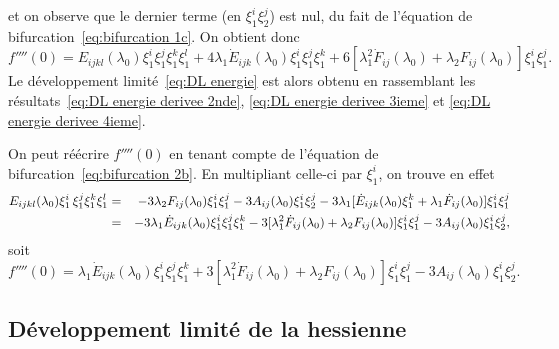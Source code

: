 \documentclass{article}
\newcommand{\mathlambda}{\lambda}
\newcommand{\nocomma}{}
\begin{document}
et on observe que le dernier terme (en $\xi_1^i \xi_2^j$) est nul, du fait de
l'{\'e}quation de bifurcation~\eqref{eq:bifurcation 1c}. On obtient donc
\begin{equation}
  \label{eq:DL energie derivee 4ieme} f'''' (0) = E_{i \nocomma j \nocomma k
  \nocomma l} (\lambda_0) \xi_1^i \xi_1^j \xi_1^k \xi_1^l + 4 \mathlambda_1
  \dot{E}_{i \nocomma j \nocomma k} (\lambda_0) \xi_1^i \xi_1^j \xi_1^k + 6
  [\mathlambda_1^2  \dot{F}_{i \nocomma j} (\mathlambda_0) + \lambda_2 F_{i
  \nocomma j} (\lambda_0)] \xi_1^i \xi_1^j .
\end{equation}
Le d{\'e}veloppement limit{\'e}~\eqref{eq:DL energie} est alors obtenu en
rassemblant les r{\'e}sultats~\eqref{eq:DL energie derivee 2nde}, \eqref{eq:DL
energie derivee 3ieme} et \eqref{eq:DL energie derivee 4ieme}.

\begin{remark}
  On peut r{\'e}{\'e}crire $f'''' (0)$ en tenant compte de l'{\'e}quation de
  bifurcation~\eqref{eq:bifurcation 2b}. En multipliant celle-ci par
  $\xi_1^i$, on trouve en effet
  \begin{eqnarray*}
    E_{i \nocomma j \nocomma k \nocomma l} (\lambda_0) \xi_1^i
    \hspace{0.17em} \xi_1^j \xi_1^k \xi_1^l & = & - 3 \lambda_2 F_{i \nocomma
    j} (\lambda_0) \xi_1^i \xi_1^j - 3 A_{i \nocomma j} (\mathlambda_0)
    \xi_1^i \xi_2^j - 3 \lambda_1  [\dot{E}_{i \nocomma j \nocomma k}
    (\mathlambda_0) \xi_1^k + \lambda_1  \dot{F}_{i \nocomma j} (\lambda_0)]
    \xi_1^i \xi_1^j\\
    & = & - 3 \lambda_1  \dot{E}_{i \nocomma j \nocomma k} (\mathlambda_0)
    \xi_1^i \xi_1^j \xi_1^k - 3 [\lambda_1^2  \dot{F}_{i \nocomma j}
    (\lambda_0) + \lambda_2 F_{i \nocomma j} (\lambda_0)] \xi_1^i \xi_1^j - 3
    A_{i \nocomma j} (\mathlambda_0) \xi_1^i \xi_2^j,
  \end{eqnarray*}
  soit
  \[ f'''' (0) = \mathlambda_1  \dot{E}_{i \nocomma j \nocomma k} (\lambda_0)
     \xi_1^i \xi_1^j \xi_1^k + 3 [\mathlambda_1^2  \dot{F}_{i \nocomma j}
     (\mathlambda_0) + \lambda_2 F_{i \nocomma j} (\lambda_0)] \xi_1^i \xi_1^j
     - 3 A_{i \nocomma j} (\mathlambda_0) \xi_1^i \xi_2^j . \]
\end{remark}

\subsection{D{\'e}veloppement limit{\'e} de la hessienne}\label{sec:DL
hessienne}
\end{document}
